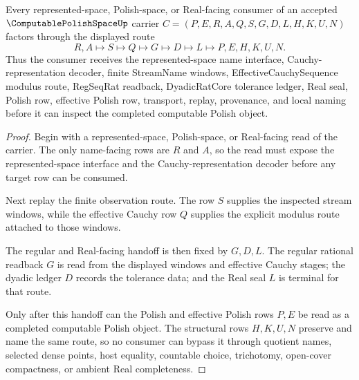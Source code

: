 \begin{theorem}\label{thm:computable-polish-space-realizer-handoff}
Every represented-space, Polish-space, or Real-facing consumer of an accepted $\ComputablePolishSpaceUp$ carrier $C=(P,E,R,A,Q,S,G,D,L,H,K,U,N)$ factors through the displayed route
$$
R,A \longmapsto S \longmapsto Q \longmapsto G \longmapsto D \longmapsto L \longmapsto P,E,H,K,U,N .
$$
Thus the consumer receives the represented-space name interface, Cauchy-representation decoder, finite StreamName windows, EffectiveCauchySequence modulus route, RegSeqRat readback, DyadicRatCore tolerance ledger, Real seal, Polish row, effective Polish row, transport, replay, provenance, and local naming before it can inspect the completed computable Polish object.
\end{theorem}
\begin{proof}
Begin with a represented-space, Polish-space, or Real-facing read of the carrier. The only name-facing rows are $R$ and $A$, so the read must expose the represented-space interface and the Cauchy-representation decoder before any target row can be consumed.

Next replay the finite observation route. The row $S$ supplies the inspected stream windows, while the effective Cauchy row $Q$ supplies the explicit modulus route attached to those windows.

The regular and Real-facing handoff is then fixed by $G,D,L$. The regular rational readback $G$ is read from the displayed windows and effective Cauchy stages; the dyadic ledger $D$ records the tolerance data; and the Real seal $L$ is terminal for that route.

Only after this handoff can the Polish and effective Polish rows $P,E$ be read as a completed computable Polish object. The structural rows $H,K,U,N$ preserve and name the same route, so no consumer can bypass it through quotient names, selected dense points, host equality, countable choice, trichotomy, open-cover compactness, or ambient Real completeness.
\end{proof}


